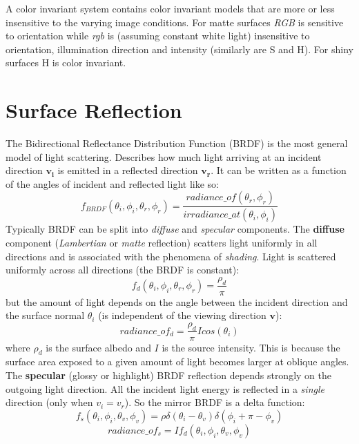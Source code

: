 \documentclass[a4paper,twocolumn]{article}
\begin{document}
A color invariant system contains color invariant models that are more or less
insensitive to the varying image conditions. For matte surfaces
\textit{RGB} is sensitive to orientation while \textit{rgb} is (assuming
constant white light) insensitive to orientation, illumination direction and
intensity (similarly are S and H). For shiny surfaces H is color invariant.


\section{Surface Reflection}
The Bidirectional Reflectance Distribution Function (BRDF) is the most general
model of light scattering. Describes how much light arriving at an incident
direction $\mathbf{v_i}$ is emitted in a reflected direction $\mathbf{v_r}$. It
can be written as a function of the angles of incident and reflected light like so:
\begin{equation}
f_{BRDF}(\theta_i, \phi_i, \theta_r, \phi_r) =
	\frac{radiance\_of(\theta_r, \phi_r)}{irradiance\_at(\theta_i, \phi_i)}
\end{equation}
Typically BRDF can be split into \textit{diffuse} and \textit{specular}
components. The \textbf{diffuse} component (\textit{Lambertian} or \textit{matte}
reflection) scatters light uniformly in all directions and is associated with
the phenomena of \textit{shading}. Light is scattered uniformly across all
directions (the BRDF is constant):
\begin{equation}
f_d(\theta_i, \phi_i, \theta_r, \phi_r) = \frac{\rho_d}{\pi}
\end{equation}
but the amount of light depends on the angle between the incident direction and
the surface normal $\theta_i$ (is independent of the viewing direction
$\mathbf{v}$):
\begin{equation}
radiance\_of_d = \frac{\rho_d}{\pi} I cos(\theta_i)
\end{equation}
where $\rho_d$ is the surface albedo and $I$ is the source intensity.
This is because the surface area exposed to a given amount of light becomes
larger at oblique angles. The \textbf{specular} (glossy or highlight) BRDF reflection
depends strongly on the outgoing light direction. All the incident light energy
is reflected in a \textit{single} direction (only when $v_i = v_r$). So the
mirror BRDF is a delta function:
\begin{equation}
f_s(\theta_i, \phi_i, \theta_v, \phi_v) = \rho \delta(\theta_i - \theta_v)
\delta(\phi_i + \pi - \phi_v)
\end{equation}
\begin{equation}
radiance\_of_s = I f_d(\theta_i, \phi_i, \theta_v, \phi_v)
\end{equation}
\end{document}
